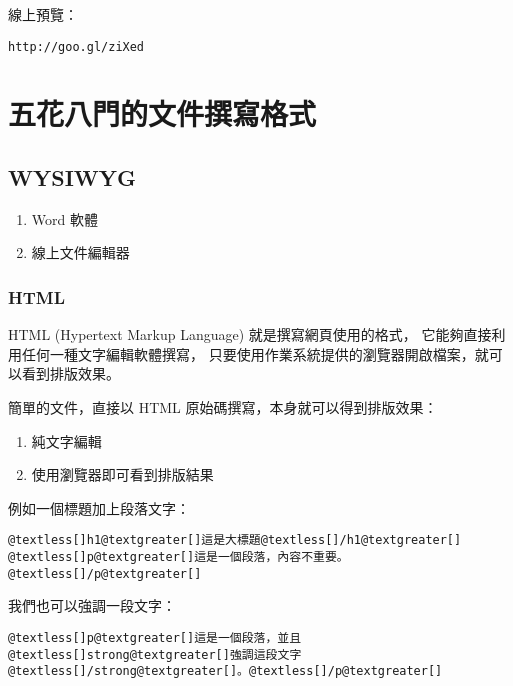 \documentclass[a4paper,12pt,english]{sphinxmanual}
\begin{document}
線上預覽：

\begin{Verbatim}[commandchars=@\[\]]
http://goo.gl/ziXed
\end{Verbatim}


\chapter{五花八門的文件撰寫格式}
\label{syntax::doc}\label{syntax:id1}

\section{WYSIWYG}
\label{syntax:wysiwyg}\begin{enumerate}
\item {} 
Word 軟體

\item {} 
線上文件編輯器

\end{enumerate}


\subsection{HTML}
\label{syntax:html}
HTML (Hypertext Markup Language) 就是撰寫網頁使用的格式，
它能夠直接利用任何一種文字編輯軟體撰寫，
只要使用作業系統提供的瀏覽器開啟檔案，就可以看到排版效果。

簡單的文件，直接以 HTML 原始碼撰寫，本身就可以得到排版效果：
\begin{enumerate}
\item {} 
純文字編輯

\item {} 
使用瀏覽器即可看到排版結果

\end{enumerate}

例如一個標題加上段落文字：

\begin{Verbatim}[commandchars=@\[\]]
@textless[]h1@textgreater[]這是大標題@textless[]/h1@textgreater[]
@textless[]p@textgreater[]這是一個段落，內容不重要。@textless[]/p@textgreater[]
\end{Verbatim}

我們也可以強調一段文字：

\begin{Verbatim}[commandchars=@\[\]]
@textless[]p@textgreater[]這是一個段落，並且@textless[]strong@textgreater[]強調這段文字@textless[]/strong@textgreater[]。@textless[]/p@textgreater[]
\end{Verbatim}
\end{document}
